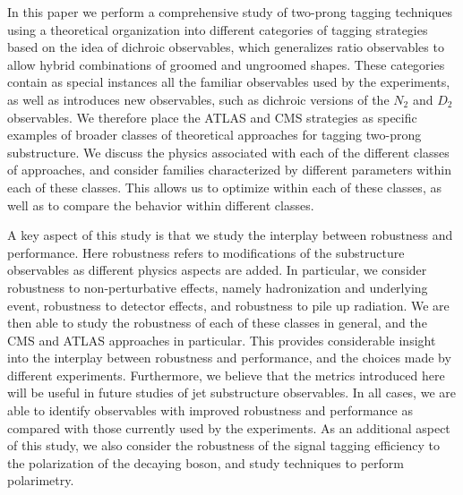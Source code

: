 \documentclass[11pt,letterpaper]{article}
\begin{document}
In this paper we perform a comprehensive study of two-prong tagging techniques using a theoretical organization into different categories of tagging strategies based on the idea of dichroic observables, which generalizes ratio observables to allow hybrid combinations of groomed and ungroomed shapes. These categories contain as special instances all the familiar observables used by the experiments, as well as introduces new observables, such as dichroic versions of the $N_2$ and $D_2$ observables. We therefore place the ATLAS and CMS strategies as specific examples of broader classes of theoretical approaches for tagging two-prong substructure. 
We discuss the physics associated with each of the different classes of approaches, and consider families characterized by different parameters within each of these classes. This allows us to optimize within each of these classes, as well as to compare the behavior within different classes.


A key aspect of this study is that we study the interplay between robustness and performance. Here robustness refers to modifications of the substructure observables as different physics aspects are added. In particular, we consider robustness to non-perturbative effects, namely hadronization and underlying event, robustness to detector effects, and robustness to pile up radiation. We are then able to study the robustness of each of these classes in general, and the CMS and ATLAS approaches in particular. This provides considerable insight into the interplay between robustness and performance, and the choices made by different experiments. Furthermore, we believe that the metrics introduced here will be useful in future studies of jet substructure observables. In all cases, we are able to identify observables with improved robustness and performance as compared with those currently used by the experiments. As an additional aspect of this study, we also consider the robustness of the signal tagging efficiency to the polarization of the decaying boson, and study techniques to perform polarimetry. 




 

\end{document}
